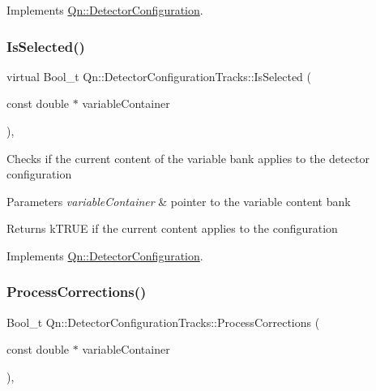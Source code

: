 Implements \mbox{\hyperlink{classQn_1_1DetectorConfiguration_a4298530954cc8dabbd41b1fd83d6310f}{Qn\+::\+Detector\+Configuration}}.

\mbox{\label{classQn_1_1DetectorConfigurationTracks_a5382a901ca706cab5df207b3c503df65}} 
\subsubsection{\texorpdfstring{Is\+Selected()}{IsSelected()}}
{\footnotesize\ttfamily virtual Bool\+\_\+t Qn\+::\+Detector\+Configuration\+Tracks\+::\+Is\+Selected (\begin{DoxyParamCaption}\item[{const double $\ast$}]{variable\+Container }\end{DoxyParamCaption})\hspace{0.3cm}{\ttfamily [inline]}, {\ttfamily [virtual]}}

Checks if the current content of the variable bank applies to the detector configuration 
\begin{DoxyParams}{Parameters}
{\em variable\+Container} & pointer to the variable content bank \\
\hline
\end{DoxyParams}
\begin{DoxyReturn}{Returns}
k\+T\+R\+UE if the current content applies to the configuration 
\end{DoxyReturn}


Implements \mbox{\hyperlink{classQn_1_1DetectorConfiguration}{Qn\+::\+Detector\+Configuration}}.

\mbox{\label{classQn_1_1DetectorConfigurationTracks_a14705aef0b98cfe6d2b20c51676bcc0a}} 
\subsubsection{\texorpdfstring{Process\+Corrections()}{ProcessCorrections()}}
{\footnotesize\ttfamily Bool\+\_\+t Qn\+::\+Detector\+Configuration\+Tracks\+::\+Process\+Corrections (\begin{DoxyParamCaption}\item[{const double $\ast$}]{variable\+Container }\end{DoxyParamCaption})\hspace{0.3cm}{\ttfamily [inline]}, {\ttfamily [virtual]}}

